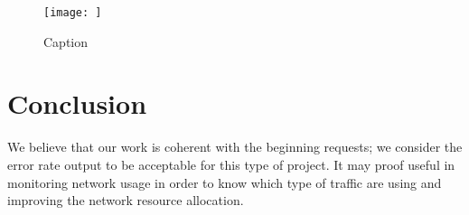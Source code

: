 \documentclass[11pt, USenglish]{article}
\begin{document}
\begin{figure}[ht]
    \centering
    \texttt{[image: ]}
    \caption{Caption}
    \label{fig:my_label}
\end{figure}

\section{Conclusion}
We believe that our work is coherent with the beginning requests; we consider the error rate output to be acceptable for this type of project. It may proof useful in monitoring network usage in order to know which type of traffic are using and improving the network resource allocation. 
\end{document}
